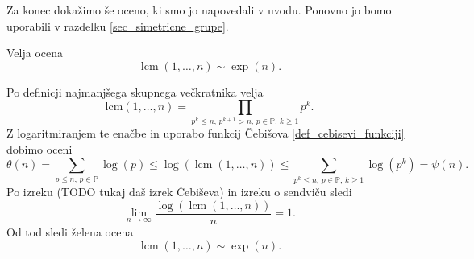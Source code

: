Za konec dokažimo še oceno, ki smo jo napovedali v uvodu. Ponovno jo bomo uporabili v razdelku \ref{sec_simetricne_grupe}.
\begin{lema}
  \label{lem_lcm_exp_n}
  Velja ocena \begin{equation*}
  \operatorname{lcm}(1, \ldots, n) \sim \exp(n).
  \end{equation*}  
  \end{lema}
  \begin{dokaz}
  Po definicji najmanjšega skupnega večkratnika velja \begin{equation*}
  \text{lcm}(1, \ldots, n) = \prod_{p^{k} \le n, \, p^{k + 1} > n,\,   p \in \mathbb{P}, \, k \ge 1 } p^{k}.
  \end{equation*}  
  Z logaritmiranjem te enačbe in uporabo funkcij Čebišova \ref{def_cebisevi_funkciji} dobimo oceni \begin{equation*}
  \theta(n) = \sum_{p \le n, \,   p \in \mathbb{P}} \log(p) \le \log(\operatorname{lcm}(1, \ldots ,n)) \le  \sum_{p^{k} \le n, \, p \in \mathbb{P}, \, k \ge 1 } \log(p^{k}) = \psi(n).
  \end{equation*}  
  Po izreku (TODO tukaj daš izrek Čebiševa) in izreku o sendviču sledi \begin{equation*}
  \lim_{n \to \infty} \frac{\log(\operatorname{lcm}(1, \ldots, n))}{n} = 1.
  \end{equation*}  
    Od tod sledi želena ocena \begin{equation*}
      \operatorname{lcm}(1, \ldots, n) \sim \exp(n).
  \end{equation*} 
  \end{dokaz}





